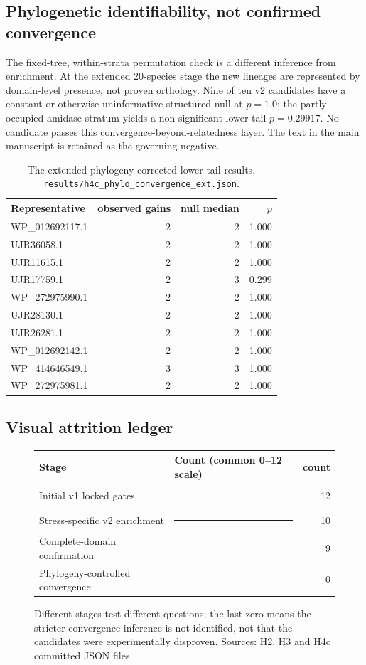 \subsection{Phylogenetic identifiability, not confirmed convergence}
The fixed-tree, within-strata permutation check is a different inference from enrichment. At the extended 20-species stage the new lineages are represented by domain-level presence, not proven orthology. Nine of ten v2 candidates have a constant or otherwise uninformative structured null at $p=1.0$; the partly occupied amidase stratum yields a non-significant lower-tail $p=0.29917$. No candidate passes this convergence-beyond-relatedness layer. The text in the main manuscript is retained as the governing negative.
\begin{table}[!htbp]\centering\small\caption{The extended-phylogeny corrected lower-tail results, \texttt{results/h4c\_phylo\_convergence\_ext.json}.}\begin{tabular}{lrrr}\hline Representative & observed gains & null median & $p$ \\\hline
WP\_012692117.1 & 2 & 2 & 1.000 \\
UJR36058.1 & 2 & 2 & 1.000 \\
UJR11615.1 & 2 & 2 & 1.000 \\
UJR17759.1 & 2 & 3 & 0.299 \\
WP\_272975990.1 & 2 & 2 & 1.000 \\
UJR28130.1 & 2 & 2 & 1.000 \\
UJR26281.1 & 2 & 2 & 1.000 \\
WP\_012692142.1 & 2 & 2 & 1.000 \\
WP\_414646549.1 & 3 & 3 & 1.000 \\
WP\_272975981.1 & 2 & 2 & 1.000 \\
\hline\end{tabular}\end{table}
\subsection{Visual attrition ledger}
\begin{figure}[ht]\centering\small\begin{tabular}{llr}\hline Stage & Count (common 0--12 scale) & count \\\hline
Initial v1 locked gates & \textcolor{black}{\rule{7.2cm}{5pt}} & 12 \\
Stress-specific v2 enrichment & \textcolor{paperblue}{\rule{6cm}{5pt}} & 10 \\
Complete-domain confirmation & \textcolor{paperblue}{\rule{5.4cm}{5pt}} & 9 \\
Phylogeny-controlled convergence & \textcolor{black}{\rule{0cm}{5pt}} & 0 \\\hline\end{tabular}\caption{Different stages test different questions; the last zero means the stricter convergence inference is not identified, not that the candidates were experimentally disproven. Sources: H2, H3 and H4c committed JSON files.}\end{figure}
